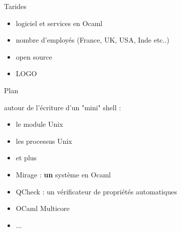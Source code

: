 
\begin{frame}{Tarides}
\wip
    \begin{itemize}[label=$-$]
        \item logiciel et services en Ocaml
        \item  nombre d'employés (France, UK, USA, Inde etc..)
        \item open source  
        \item LOGO
    \end{itemize}
\end{frame}

\begin{frame}{Plan}
\wip

   
    autour de l'écriture d'un "mini" shell :
    \begin{itemize}[label=]
        \item le module Unix
        \item les processus Unix  
        \item et plus 
    \end{itemize}   
    
     \begin{itemize}[label=$-$]
        \item Mirage : \textbf{un} système en Ocaml
        \item QCheck : un vérificateur de propriétés automatiques
        \item OCaml Multicore 
        \item ... 
    \end{itemize}   
\end{frame}